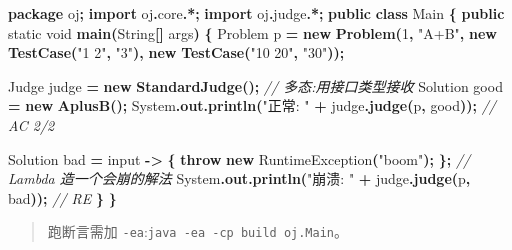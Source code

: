 \documentclass[
  11pt,
]{ctexart}
\newenvironment{Shaded}{\begin{snugshade}}{\end{snugshade}}
\newcommand{\BuiltInTok}[1]{#1}
\newcommand{\CommentTok}[1]{\textcolor[rgb]{0.56,0.35,0.01}{\textit{#1}}}
\newcommand{\ControlFlowTok}[1]{\textcolor[rgb]{0.13,0.29,0.53}{\textbf{#1}}}
\newcommand{\DataTypeTok}[1]{\textcolor[rgb]{0.13,0.29,0.53}{#1}}
\newcommand{\DecValTok}[1]{\textcolor[rgb]{0.00,0.00,0.81}{#1}}
\newcommand{\FunctionTok}[1]{\textcolor[rgb]{0.13,0.29,0.53}{\textbf{#1}}}
\newcommand{\ImportTok}[1]{#1}
\newcommand{\KeywordTok}[1]{\textcolor[rgb]{0.13,0.29,0.53}{\textbf{#1}}}
\newcommand{\NormalTok}[1]{#1}
\newcommand{\OperatorTok}[1]{\textcolor[rgb]{0.81,0.36,0.00}{\textbf{#1}}}
\newcommand{\StringTok}[1]{\textcolor[rgb]{0.31,0.60,0.02}{#1}}
\begin{document}
\begin{Shaded}
\begin{Highlighting}[]
\KeywordTok{package}\ImportTok{ oj}\OperatorTok{;}
\KeywordTok{import} \ImportTok{oj}\OperatorTok{.}\ImportTok{core}\OperatorTok{.*;}
\KeywordTok{import} \ImportTok{oj}\OperatorTok{.}\ImportTok{judge}\OperatorTok{.*;}
\KeywordTok{public} \KeywordTok{class}\NormalTok{ Main }\OperatorTok{\{}
    \KeywordTok{public} \DataTypeTok{static} \DataTypeTok{void} \FunctionTok{main}\OperatorTok{(}\BuiltInTok{String}\OperatorTok{[]}\NormalTok{ args}\OperatorTok{)} \OperatorTok{\{}
\NormalTok{        Problem p }\OperatorTok{=} \KeywordTok{new} \FunctionTok{Problem}\OperatorTok{(}\DecValTok{1}\OperatorTok{,} \StringTok{"A+B"}\OperatorTok{,}
            \KeywordTok{new} \FunctionTok{TestCase}\OperatorTok{(}\StringTok{"1 2"}\OperatorTok{,} \StringTok{"3"}\OperatorTok{),} \KeywordTok{new} \FunctionTok{TestCase}\OperatorTok{(}\StringTok{"10 20"}\OperatorTok{,} \StringTok{"30"}\OperatorTok{));}

\NormalTok{        Judge judge }\OperatorTok{=} \KeywordTok{new} \FunctionTok{StandardJudge}\OperatorTok{();}          \CommentTok{// 多态:用接口类型接收}
\NormalTok{        Solution good }\OperatorTok{=} \KeywordTok{new} \FunctionTok{AplusB}\OperatorTok{();}
        \BuiltInTok{System}\OperatorTok{.}\FunctionTok{out}\OperatorTok{.}\FunctionTok{println}\OperatorTok{(}\StringTok{"正常: "} \OperatorTok{+}\NormalTok{ judge}\OperatorTok{.}\FunctionTok{judge}\OperatorTok{(}\NormalTok{p}\OperatorTok{,}\NormalTok{ good}\OperatorTok{));}        \CommentTok{// AC 2/2}

\NormalTok{        Solution bad }\OperatorTok{=}\NormalTok{ input }\OperatorTok{{-}\textgreater{}} \OperatorTok{\{} \ControlFlowTok{throw} \KeywordTok{new} \BuiltInTok{RuntimeException}\OperatorTok{(}\StringTok{"boom"}\OperatorTok{);} \OperatorTok{\};}  \CommentTok{// Lambda 造一个会崩的解法}
        \BuiltInTok{System}\OperatorTok{.}\FunctionTok{out}\OperatorTok{.}\FunctionTok{println}\OperatorTok{(}\StringTok{"崩溃: "} \OperatorTok{+}\NormalTok{ judge}\OperatorTok{.}\FunctionTok{judge}\OperatorTok{(}\NormalTok{p}\OperatorTok{,}\NormalTok{ bad}\OperatorTok{));}         \CommentTok{// RE}
    \OperatorTok{\}}
\OperatorTok{\}}
\end{Highlighting}
\end{Shaded}

\begin{quote}
跑断言需加 \texttt{-ea}:\texttt{java\ -ea\ -cp\ build\ oj.Main}。
\end{quote}
\end{document}
